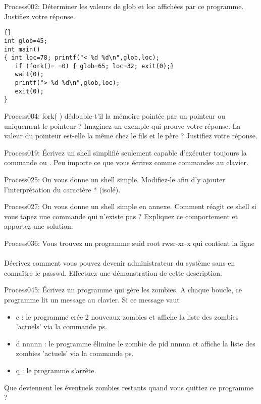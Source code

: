 
\begin{list}{+}{}


\item Process002: 
Déterminer les valeurs de glob et loc affichées par ce programme. Justifiez votre réponse.
\begin{lstlisting}[frame=trBL]{}
int glob=45;
int main()
{ int loc=78; printf("< %d %d\n",glob,loc);
   if (fork()= =0) { glob=65; loc=32; exit(0);}
   wait(0);
   printf("> %d %d\n",glob,loc);
   exit(0);
}
\end{lstlisting}

\item Process004: 
fork( ) dédouble-t'il la mémoire pointée par un pointeur ou uniquement le pointeur ? Imaginez un exemple qui prouve votre réponse. La valeur du pointeur est-elle la même chez le fils et le père ? Justifiez votre réponse.

\item Process019: 
Écrivez un shell simplifié seulement capable d'exécuter toujours la commande
 ou . Peu importe ce que vous écrirez comme commandes au clavier. 

\item Process025: 
On vous donne un shell simple. Modifiez-le afin d'y ajouter l'interprétation du caractère * (isolé). 

\item Process027: 
On vous donne un shell simple en annexe. Comment réagit ce shell si vous tapez une commande qui n'existe pas ? Expliquez ce comportement et apportez une solution.

\item Process036: 
Vous trouvez un programme suid root rwsr-xr-x qui contient la ligne \\
\\
Décrivez comment vous pouvez devenir administrateur du système sans en connaître le passwd.
Effectuez une démonstration de cette description.

\item Process045: 
Écrivez un programme qui gère les zombies. A chaque boucle, ce programme lit un message au clavier. Si ce message vaut
\begin{itemize} 
\item c  : le programme crée 2 nouveaux zombies et affiche la liste des zombies 'actuels' via la commande ps.
\item d nnnnn : le programme élimine le zombie de pid nnnnn et affiche la liste des zombies 'actuels' via la commande ps.
\item q : le programme s'arrête.
\end{itemize} 
Que deviennent les éventuels zombies restants quand vous quittez ce programme ? 


\end{list}
